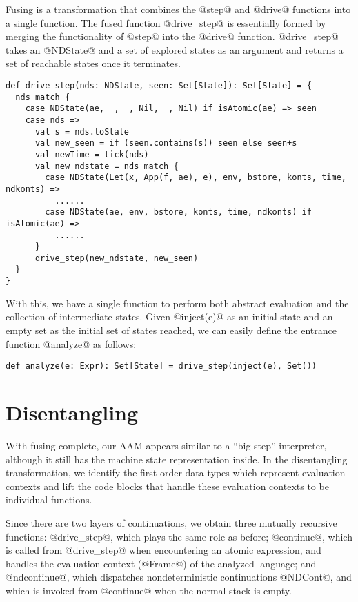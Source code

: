 \documentclass[acmsmall]{acmart}\settopmatter{}
\begin{document}
Fusing is a transformation that combines the @step@ and @drive@ functions into a single
function.
The fused function @drive_step@ is essentially formed by merging the functionality of
@step@ into the @drive@ function.
@drive_step@ takes an @NDState@ and a set of explored states as an argument
and returns a set of reachable states once it terminates.

\begin{lstlisting}
def drive_step(nds: NDState, seen: Set[State]): Set[State] = {
  nds match {
    case NDState(ae, _, _, Nil, _, Nil) if isAtomic(ae) => seen
    case nds =>
      val s = nds.toState
      val new_seen = if (seen.contains(s)) seen else seen+s
      val newTime = tick(nds)
      val new_ndstate = nds match {
        case NDState(Let(x, App(f, ae), e), env, bstore, konts, time, ndkonts) =>
          ......
        case NDState(ae, env, bstore, konts, time, ndkonts) if isAtomic(ae) =>
          ......
      }
      drive_step(new_ndstate, new_seen)
  }
}
\end{lstlisting}

With this, we have a single function to perform both abstract evaluation and the collection of
intermediate states. Given @inject(e)@ as an initial state and an empty set as the
initial set of states reached, we can easily define the entrance function @analyze@ as
follows:

\begin{lstlisting}
def analyze(e: Expr): Set[State] = drive_step(inject(e), Set())
\end{lstlisting}

\section{Disentangling} \label{disen}

With fusing complete, our AAM
appears similar to a ``big-step'' interpreter, although it still has the machine
state representation inside.
In the disentangling transformation, we
identify the first-order data types which represent evaluation contexts
and lift the code blocks that handle these evaluation contexts to be individual functions.

Since there are two layers of continuations,
we obtain three mutually recursive functions: @drive_step@, which plays the same
role as before; @continue@, which is called from @drive_step@ when encountering an atomic expression, and handles the evaluation context (@Frame@) of the analyzed
language; and @ndcontinue@, which dispatches nondeterministic continuations @NDCont@,
and which is invoked from @continue@ when the normal stack is empty.
\end{document}
